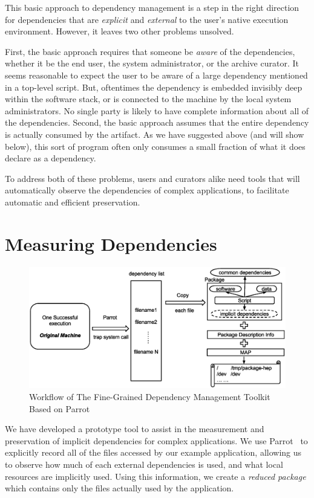 \documentclass[procedia]{easychair}
\begin{document}
This basic approach to dependency management is a step in the right direction
for dependencies that are \emph{explicit} and \emph{external} to the
user's native execution environment.  However, it leaves two other problems unsolved.

First, the basic approach requires that someone be \emph{aware} of the dependencies,
whether it be the end user, the system administrator, or the archive curator.
It seems reasonable to expect the user to be aware of a large dependency mentioned in a top-level script.
But, oftentimes the dependency is embedded invisibly deep within the software stack,
or is connected to the machine by the local system administrators.  No single party
is likely to have complete information about all of the dependencies.
Second, the basic approach assumes that the entire dependency is actually
consumed by the artifact.  As we have suggested above (and will show below),
this sort of program often only consumes a small fraction of what it does declare
as a dependency.

To address both of these problems, users and curators alike need tools that
will automatically observe the dependencies of complex applications, to
facilitate automatic and efficient preservation.

\section{Measuring Dependencies}

\begin{figure}
\centering
\includegraphics[width=.8\textwidth]{workflow-parrot.eps}
\caption{Workflow of The Fine-Grained Dependency Management Toolkit Based on Parrot}
\label{fig:workflow-parrot}
\end{figure}

We have developed a prototype tool to assist in the measurement and preservation
of implicit dependencies for complex applications.
We use Parrot~\cite{thain2005parrot} to explicitly record all
of the files accessed by our example application, allowing us to observe how
much of each external dependencies is used, and what local resources are implicitly used.
Using this information, we create a \emph{reduced package} which contains
only the files actually used by the application.
\end{document}
